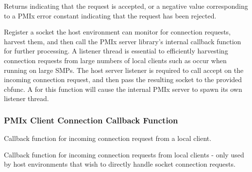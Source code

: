 \begin{arglist}
\end{arglist}

Returns  indicating that the request is accepted, or a negative value corresponding to a PMIx error constant indicating that the request has been rejected.

\descr

Register a socket the host environment can monitor for connection requests, harvest them, and then call the \ac{PMIx} server library's internal callback function for further processing.
A listener thread is essential to efficiently harvesting connection requests from large numbers of local clients such as occur when running on large SMPs.
The host server listener is required to call accept on the incoming connection request, and then pass the resulting socket to the provided cbfunc.
A  for this function will cause the internal \ac{PMIx} server to spawn its own listener thread.

\subsubsection{PMIx Client Connection Callback Function}

\summary

Callback function for incoming connection request from a local client.

\format


\begin{arglist}
\end{arglist}

\descr

Callback function for incoming connection requests from local clients - only used by host environments that wish to directly handle socket connection requests.


\subsection{}

